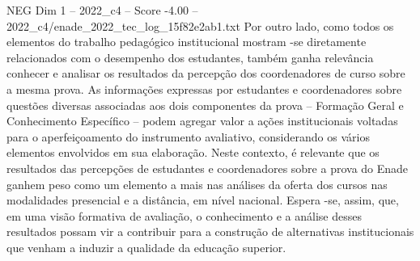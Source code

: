 \begin{textsample}{NEG Dim 1 – 2022\_c4 – Score -4.00 – 2022\_c4/enade\_2022\_tec\_log\_15f82e2ab1.txt}
Por outro lado, como todos os elementos do trabalho pedagógico institucional mostram -se diretamente relacionados com o desempenho dos estudantes, também ganha relevância conhecer e analisar os resultados da percepção dos coordenadores de curso sobre a mesma prova.
As informações expressas por estudantes e coordenadores sobre questões diversas associadas aos dois componentes da prova – Formação Geral e Conhecimento Específico – podem agregar valor a ações institucionais voltadas para o aperfeiçoamento do instrumento avaliativo, considerando os vários elementos envolvidos em sua elaboração.
Neste contexto, é relevante que os resultados das percepções de estudantes e coordenadores sobre a prova do Enade ganhem peso como um elemento a mais nas análises da oferta dos cursos nas modalidades presencial e a distância, em nível nacional.
Espera -se, assim, que, em uma visão formativa de avaliação, o conhecimento e a análise desses resultados possam vir a contribuir para a construção de alternativas institucionais que venham a induzir a qualidade da educação superior.

\end{textsample}
